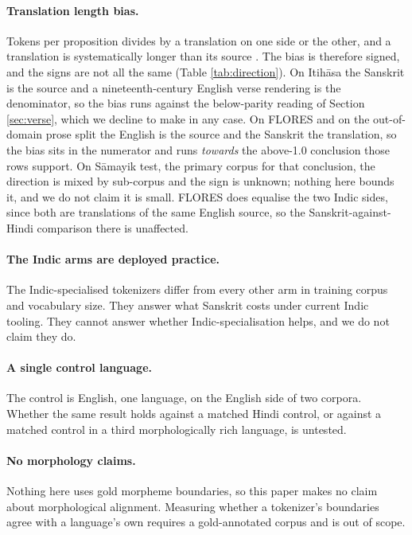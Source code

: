 \documentclass[11pt]{article}
\begin{document}
\paragraph{Translation length bias.} Tokens per proposition divides by a translation on one
side or the other, and a translation is systematically longer than its source
\citep{koppel-ordan-2011-translationese,volansky-etal-2015-features,%
graham-etal-2020-statistical}. The bias is therefore signed, and the signs are not all the
same (Table \ref{tab:direction}). On Itih\=asa the Sanskrit is the source and a
nineteenth-century English verse rendering is the denominator, so the bias runs against the
below-parity reading of Section \ref{sec:verse}, which we decline to make in any case. On
FLORES and on the out-of-domain prose split the English is the source and the Sanskrit the
translation, so the bias sits in the numerator and runs \emph{towards} the above-1.0
conclusion those rows support. On S\=amayik test, the primary corpus for that conclusion,
the direction is mixed by sub-corpus and the sign is unknown; nothing here bounds it, and
we do not claim it is small. FLORES does equalise the two Indic sides, since both are
translations of the same English source, so the Sanskrit-against-Hindi comparison there is
unaffected.

\paragraph{The Indic arms are deployed practice.} The Indic-specialised tokenizers differ
from every other arm in training corpus and vocabulary size. They answer what Sanskrit
costs under current Indic tooling. They cannot answer whether Indic-specialisation helps,
and we do not claim they do.

\paragraph{A single control language.} The control is English, one language, on the
English side of two corpora. Whether the same result holds against a matched Hindi
control, or against a matched control in a third morphologically rich language, is
untested.

\paragraph{No morphology claims.} Nothing here uses gold morpheme boundaries, so this
paper makes no claim about morphological alignment. Measuring whether a tokenizer's
boundaries agree with a language's own \citep{arnett-etal-2025-morphscore} requires a
gold-annotated corpus and is out of scope.
\end{document}
